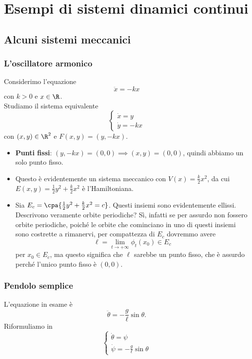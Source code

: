 \chapter{Esempi di sistemi dinamici continui}

\section{Alcuni sistemi meccanici}
\subsection{L'oscillatore armonico}
Considerimo l'equazione
\[\ddot x=-kx\]
con $k>0$ e $x\in \R$.\\
Studiamo il sistema equivalente
\[\begin{cases}
\dot x=y\\
\dot y=-kx
\end{cases}\]
con $(x,y)\in\R^2$ e $F(x,y)=(y,-kx)$.

\begin{itemize}
\item \textbf{Punti fissi}: $(y,-kx)=(0,0)\implies (x,y)=(0,0)$, quindi abbiamo un solo punto fisso.
\item Questo \`e evidentemente un sistema meccanico con $V(x)=\frac k2 x^2$, da cui $E(x,y)=\frac12 y^2+\frac k2 x^2$ \`e l'Hamiltoniana.
\item Sia $E_c=\cpa{\frac12y^2+\frac k2x^2=c}$. Questi insiemi sono evidentemente ellissi. Descrivono veramente orbite periodiche? S\`i, infatti se per assurdo non fossero orbite periodiche, poich\'e le orbite che cominciano in uno di questi insiemi sono costrette a rimanervi, per compattezza di $E_c$ dovremmo avere 
\[\ell=\lim_{t\to+\infty}\phi_t(x_0)\in E_c\] 
per $x_0\in E_c$, ma questo significa che $\ell$ sarebbe un punto fisso, che \`e assurdo perch\'e l'unico punto fisso \`e $(0,0)$.
\end{itemize}

\subsection{Pendolo semplice}
L'equazione in esame \`e
\[\ddot \theta=-\frac g\ell\sin\theta.\]
Riformuliamo in
\[\begin{cases}
\dot\theta=\psi\\
\dot\psi=-\frac g\ell\sin\theta
\end{cases}\]

